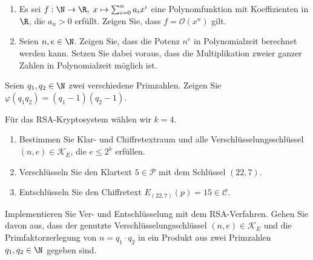 \documentclass[german]{mhexsheet}
\newcommand{\mc}{\mathcal}
\begin{document}
\maketitle

 
 \begin{exercise}[title = Laufzeiten von Algorithmen]
  \begin{enumerate}
  \item Es sei $f: \N \rightarrow \R, \; x \mapsto \sum_{i=0}^n a_ix^i$ eine Polynomfunktion mit Koeffizienten in $\R$, die $a_n> 0$ erfüllt. Zeigen Sie, dass $f = \mathcal O(x^n)$ gilt.
  \item Seien $n, e \in \N$. Zeigen Sie, dass die Potenz $n^e$ in Polynomialzeit berechnet werden kann. Setzen Sie dabei voraus, dass die Multiplikation zweier ganzer Zahlen in Polynomialzeit möglich ist.
  \end{enumerate}
 \end{exercise}

 \begin{exercise}[title = $\varphi$-Funktion]
 Seien $q_1, q_2 \in \N$ zwei verschiedene Primzahlen. Zeigen Sie $\varphi(q_1q_2) = (q_1-1)(q_2-1)$.
\end{exercise}
 
 \begin{exercise}[title = RSA-Verfahren]
  Für das RSA-Kryptosystem wählen wir $k = 4$. 
  \begin{enumerate}
   \item Bestimmen Sie Klar- und Chiffretextraum und alle Verschlüsselungsschlüssel $(n, e) \in \mathcal K_E$, die $e \leq 2^k$ erfüllen.
   \item Verschlüsseln Sie den Klartext $5 \in \mathcal P$ mit dem Schlüssel $(22, 7)$. 
   \item Entschlüsseln Sie den Chiffretext $E_{(22, 7)}(p) = 15 \in \mathcal C$.
  \end{enumerate}
 \end{exercise}

 \begin{exercise}[title = Implementierung RSA-Verfahren]
  Implementieren Sie Ver- und Entschlüsselung mit dem RSA-Verfahren. Gehen Sie davon aus, dass der genutzte Verschlüsselungsschlüssel $(n, e) \in \mc K_E$ und die Primfaktorzerlegung von $n = q_1 \cdot q_2$ in ein Produkt aus zwei Primzahlen $q_1, q_2 \in \N$ gegeben sind.
 \end{exercise}

 
\end{document}
